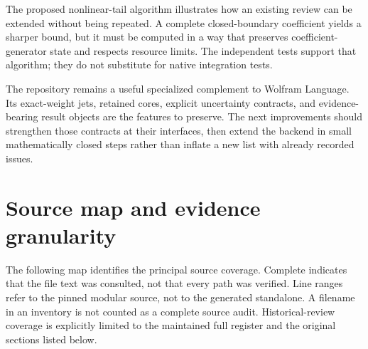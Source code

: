 \documentclass[11pt,a4paper]{article}
\begin{document}
The proposed nonlinear-tail algorithm illustrates how an existing review can be extended without being repeated. A complete closed-boundary coefficient yields a sharper bound, but it must be computed in a way that preserves coefficient-generator state and respects resource limits. The independent tests support that algorithm; they do not substitute for native integration tests.

The repository remains a useful specialized complement to Wolfram Language. Its exact-weight jets, retained cores, explicit uncertainty contracts, and evidence-bearing result objects are the features to preserve. The next improvements should strengthen those contracts at their interfaces, then extend the backend in small mathematically closed steps rather than inflate a new list with already recorded issues.

\appendix
\section{Source map and evidence granularity}

The following map identifies the principal source coverage. Complete indicates that the file text was consulted, not that every path was verified. Line ranges refer to the pinned modular source, not to the generated standalone. A filename in an inventory is not counted as a complete source audit. Historical-review coverage is explicitly limited to the maintained full register and the original sections listed below.
\end{document}
